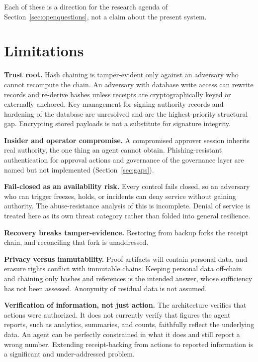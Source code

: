 \documentclass[11pt,letterpaper]{article}
\begin{document}
Each of these is a direction for the research agenda of Section~\ref{sec:openquestions}, not a claim about the present system.

\section{Limitations}\label{sec:limitations}

\textbf{Trust root.} Hash chaining is tamper-evident only against an adversary who cannot recompute the chain. An adversary with database write access can rewrite records and re-derive hashes unless receipts are cryptographically keyed or externally anchored. Key management for signing authority records and hardening of the database are unresolved and are the highest-priority structural gap. Encrypting stored payloads is not a substitute for signature integrity.

\textbf{Insider and operator compromise.} A compromised approver session inherits real authority, the one thing an agent cannot obtain. Phishing-resistant authentication for approval actions and governance of the governance layer are named but not implemented (Section~\ref{sec:gaps}).

\textbf{Fail-closed as an availability risk.} Every control fails closed, so an adversary who can trigger freezes, holds, or incidents can deny service without gaining authority. The abuse-resistance analysis of this is incomplete. Denial of service is treated here as its own threat category rather than folded into general resilience.

\textbf{Recovery breaks tamper-evidence.} Restoring from backup forks the receipt chain, and reconciling that fork is unaddressed.

\textbf{Privacy versus immutability.} Proof artifacts will contain personal data, and erasure rights conflict with immutable chains. Keeping personal data off-chain and chaining only hashes and references is the intended answer, whose sufficiency has not been assessed. Anonymity of residual data is not assumed.

\textbf{Verification of information, not just action.} The architecture verifies that actions were authorized. It does not currently verify that figures the agent reports, such as analytics, summaries, and counts, faithfully reflect the underlying data. An agent can be perfectly constrained in what it does and still report a wrong number. Extending receipt-backing from actions to reported information is a significant and under-addressed problem.
\end{document}
